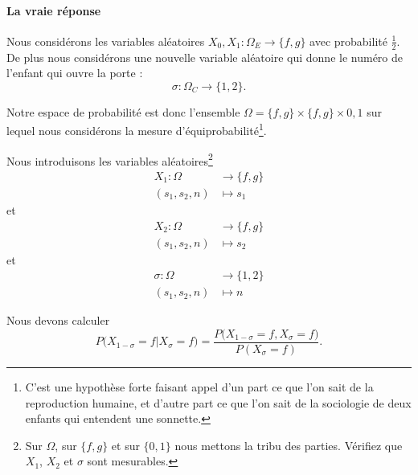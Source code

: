 \paragraph{La vraie réponse}

Nous considérons les variables aléatoires \( X_0,X_1\colon \Omega_E\to \{ f,g \}\) avec probabilité \( \frac{ 1 }{2}\). De plus nous considérons une nouvelle variable aléatoire qui donne le numéro de l'enfant qui ouvre la porte :
\begin{equation}
    \sigma\colon \Omega_C\to \{ 1,2 \}.
\end{equation}

Notre espace de probabilité est donc l'ensemble \( \Omega=\{ f,g \}\times \{ f,g \}\times {0,1}\) sur lequel nous considérons la mesure d'équiprobabilité\footnote{C'est une hypothèse forte faisant appel d'un part ce que l'on sait de la reproduction humaine, et d'autre part ce que l'on sait de la sociologie de deux enfants qui entendent une sonnette.}.

Nous introduisons les variables aléatoires\footnote{Sur \( \Omega\), sur \( \{ f,g \}\) et sur \( \{ 0,1 \}\) nous mettons la tribu des parties. Vérifiez que \( X_1\), \( X_2\) et \( \sigma\) sont mesurables.}
\begin{equation}
    \begin{aligned}
        X_1\colon \Omega&\to \{ f,g \} \\
        (s_1,s_2,n)&\mapsto s_1 
    \end{aligned}
\end{equation}
et
\begin{equation}
    \begin{aligned}
        X_2\colon \Omega&\to \{ f,g \} \\
        (s_1,s_2,n)&\mapsto s_2 
    \end{aligned}
\end{equation}
et
\begin{equation}
    \begin{aligned}
        \sigma\colon \Omega&\to \{ 1,2 \} \\
        (s_1,s_2,n)&\mapsto n
    \end{aligned}
\end{equation}


Nous devons calculer
\begin{equation}
    P\big( X_{1-\sigma}=f|X_{\sigma}=f \big)=\frac{ P\big( X_{1-\sigma}=f,X_{\sigma}=f \big) }{ P(X_{\sigma}=f) }.
\end{equation}

